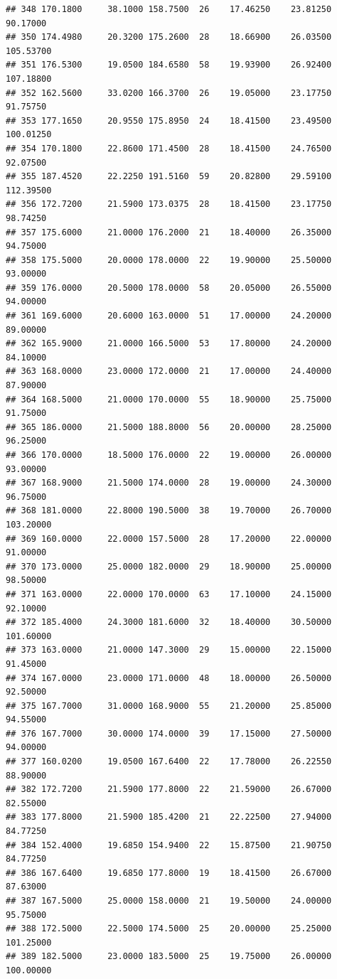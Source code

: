 \documentclass[]{article}
\begin{document}
\begin{verbatim}
## 348 170.1800     38.1000 158.7500  26    17.46250    23.81250  90.17000
## 350 174.4980     20.3200 175.2600  28    18.66900    26.03500 105.53700
## 351 176.5300     19.0500 184.6580  58    19.93900    26.92400 107.18800
## 352 162.5600     33.0200 166.3700  26    19.05000    23.17750  91.75750
## 353 177.1650     20.9550 175.8950  24    18.41500    23.49500 100.01250
## 354 170.1800     22.8600 171.4500  28    18.41500    24.76500  92.07500
## 355 187.4520     22.2250 191.5160  59    20.82800    29.59100 112.39500
## 356 172.7200     21.5900 173.0375  28    18.41500    23.17750  98.74250
## 357 175.6000     21.0000 176.2000  21    18.40000    26.35000  94.75000
## 358 175.5000     20.0000 178.0000  22    19.90000    25.50000  93.00000
## 359 176.0000     20.5000 178.0000  58    20.05000    26.55000  94.00000
## 361 169.6000     20.6000 163.0000  51    17.00000    24.20000  89.00000
## 362 165.9000     21.0000 166.5000  53    17.80000    24.20000  84.10000
## 363 168.0000     23.0000 172.0000  21    17.00000    24.40000  87.90000
## 364 168.5000     21.0000 170.0000  55    18.90000    25.75000  91.75000
## 365 186.0000     21.5000 188.8000  56    20.00000    28.25000  96.25000
## 366 170.0000     18.5000 176.0000  22    19.00000    26.00000  93.00000
## 367 168.9000     21.5000 174.0000  28    19.00000    24.30000  96.75000
## 368 181.0000     22.8000 190.5000  38    19.70000    26.70000 103.20000
## 369 160.0000     22.0000 157.5000  28    17.20000    22.00000  91.00000
## 370 173.0000     25.0000 182.0000  29    18.90000    25.00000  98.50000
## 371 163.0000     22.0000 170.0000  63    17.10000    24.15000  92.10000
## 372 185.4000     24.3000 181.6000  32    18.40000    30.50000 101.60000
## 373 163.0000     21.0000 147.3000  29    15.00000    22.15000  91.45000
## 374 167.0000     23.0000 171.0000  48    18.00000    26.50000  92.50000
## 375 167.7000     31.0000 168.9000  55    21.20000    25.85000  94.55000
## 376 167.7000     30.0000 174.0000  39    17.15000    27.50000  94.00000
## 377 160.0200     19.0500 167.6400  22    17.78000    26.22550  88.90000
## 382 172.7200     21.5900 177.8000  22    21.59000    26.67000  82.55000
## 383 177.8000     21.5900 185.4200  21    22.22500    27.94000  84.77250
## 384 152.4000     19.6850 154.9400  22    15.87500    21.90750  84.77250
## 386 167.6400     19.6850 177.8000  19    18.41500    26.67000  87.63000
## 387 167.5000     25.0000 158.0000  21    19.50000    24.00000  95.75000
## 388 172.5000     22.5000 174.5000  25    20.00000    25.25000 101.25000
## 389 182.5000     23.0000 183.5000  25    19.75000    26.00000 100.00000

\end{verbatim}
\end{document}
